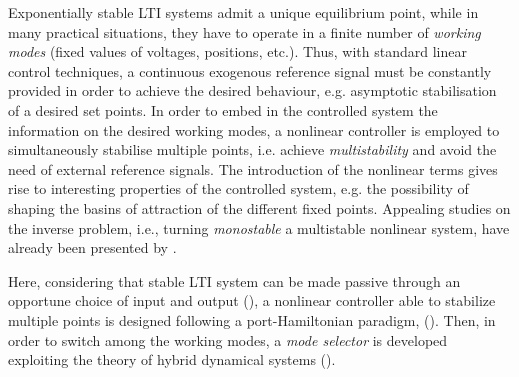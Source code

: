 Exponentially stable LTI systems admit a unique equilibrium point, while in many practical situations, they have to operate in a finite number of \textit{working modes} (fixed values of voltages, positions, etc.).
Thus, with standard linear control techniques, a continuous exogenous reference signal must be constantly provided in order to achieve the desired behaviour, e.g. asymptotic stabilisation of a desired set points.
%
In order to embed in the controlled system the information on the desired working modes, a nonlinear controller is employed to simultaneously stabilise multiple points, i.e. achieve \textit{multistability} and avoid the need of external reference signals.
The introduction of the nonlinear terms gives rise to interesting properties of the controlled system, e.g. the possibility of shaping the basins of attraction of the different fixed points.
Appealing studies on the inverse problem, i.e., turning \textit{monostable} a {multistable} nonlinear system, have already been presented by \cite{PISARCHIK2014167}.

%
Here, considering that stable LTI system can be made passive through an opportune choice of input and output (\citealp{byrnes91}), a nonlinear controller able to stabilize multiple points is designed following a port-Hamiltonian paradigm, (\citealp{876703,secchi2007control,ortega2008control,van2014port}). Then, in order to switch among the working modes, a \textit{mode selector} is developed exploiting the theory of hybrid dynamical systems (\citealp{van2000introduction,goebel2008}).

